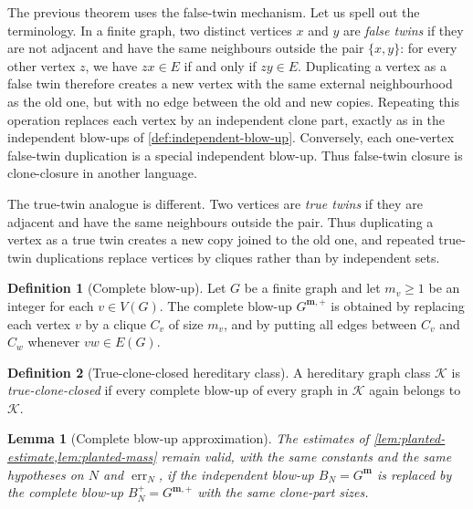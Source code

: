 \documentclass[11pt]{article}
\newtheorem{lemma}[lemma]{Lemma}
\theoremstyle{definition}
\newtheorem{definition}[definition]{Definition}
\newcommand{\K}{\mathcal{K}}
\begin{document}
The previous theorem uses the false-twin mechanism.  Let us spell out the
terminology.  In a finite graph, two distinct vertices $x$ and $y$ are
\emph{false twins} if they are not adjacent and have the same neighbours outside
the pair $\{x,y\}$: for every other vertex $z$, we have $zx\in E$ if and only
if $zy\in E$.  Duplicating a vertex as a false twin therefore creates a new
vertex with the same external neighbourhood as the old one, but with no edge
between the old and new copies.  Repeating this operation replaces each vertex
by an independent clone part, exactly as in the independent blow-ups of
\cref{def:independent-blow-up}.  Conversely, each one-vertex false-twin
duplication is a special independent blow-up.  Thus false-twin closure is
clone-closure in another language.

The true-twin analogue is different.  Two vertices are \emph{true twins} if
they are adjacent and have the same neighbours outside the pair.  Thus
duplicating a vertex as a true twin creates a new copy joined to the old one,
and repeated true-twin duplications replace vertices by cliques rather than by
independent sets.

\begin{definition}[Complete blow-up]\label{def:complete-blow-up}
Let $G$ be a finite graph and let $m_v\ge1$ be an integer for each
$v\in V(G)$.  The complete blow-up $G^{\mathbf m,+}$ is obtained by replacing
each vertex $v$ by a clique $C_v$ of size $m_v$, and by putting all edges
between $C_v$ and $C_w$ whenever $vw\in E(G)$.
\end{definition}

\begin{definition}[True-clone-closed hereditary class]
A hereditary graph class $\K$ is \emph{true-clone-closed} if every complete
blow-up of every graph in $\K$ again belongs to $\K$.
\end{definition}

\begin{lemma}[Complete blow-up approximation]\label{lem:true-planted-estimate}
The estimates of \cref{lem:planted-estimate,lem:planted-mass} remain valid,
with the same constants and the same hypotheses on $N$ and $\operatorname{err}_N$,
if the independent blow-up $B_N=G^{\mathbf m}$ is replaced by the complete
blow-up $B_N^+=G^{\mathbf m,+}$ with the same clone-part sizes.
\end{lemma}
\end{document}
